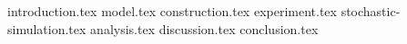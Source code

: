 {introduction.tex}
{model.tex}
{construction.tex}
{experiment.tex}
{stochastic-simulation.tex}
{analysis.tex}
{discussion.tex}
{conclusion.tex}

